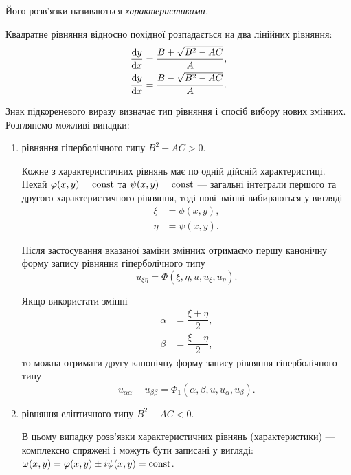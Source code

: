 \begin{definition}[характеристик]
	Його розв'язки називаються \it{характеристиками}.
\end{definition}
Квадратне рівняння відносно похідної розпадається на два лінійних рівняння:
\begin{align}
	\dfrac{\mathop{}\!\mathrm{d} y}{\mathop{}\!\mathrm{d} x} &= \dfrac{B + \sqrt{B^2 - AC}}{A}, \\ 
	\dfrac{\mathop{}\!\mathrm{d} y}{\mathop{}\!\mathrm{d} x} &= \dfrac{B - \sqrt{B^2 - AC}}{A}.
\end{align}

Знак підкореневого виразу визначає тип рівняння і спосіб вибору нових змінних. Розглянемо можливі випадки:
\begin{enumerate}
	\item рівняння гіперболічного типу $B^2 - AC > 0$. \medskip

	Кожне з  характеристичних рівнянь має по одній дійсній характеристиці. Нехай $\varphi(x,y)=\operatorname{const}$ та $\psi(x,y)=\operatorname{const}$ --- загальні інтеграли першого та другого характеристичного рівняння, тоді нові змінні вибираються у вигляді
	\begin{align}
		\xi &= \phi(x, y), \\
		\eta &= \psi(x, y).
	\end{align}

	Після застосування вказаної заміни змінних отримаємо першу канонічну форму запису рівняння гіперболічного типу 
	\begin{equation}
		u_{\xi\eta} = \Phi(\xi, \eta, u, u_\xi, u_\eta).
	\end{equation}

	\begin{remark}
		Якщо використати змінні
		\begin{align}
			\alpha &= \dfrac{\xi+\eta}{2}, \\
			\beta &= \dfrac{\xi-\eta}{2},
		\end{align}
		то можна отримати другу канонічну форму запису рівняння гіперболічного типу
		\begin{equation}
			u_{\alpha\alpha} - u_{\beta\beta} = \Phi_1(\alpha, \beta, u, u_\alpha, u_\beta).
		\end{equation}
	\end{remark}

	\item рівняння еліптичного типу $B^2 - AC < 0$. \medskip

	В цьому випадку розв'язки характеристичних рівнянь (характеристики) --- комплексно спряжені і можуть бути записані у вигляді: $\omega(x,y)=\varphi(x,y)\pm i\psi(x,y)=\operatorname{const}$. \medskip


\end{enumerate}
